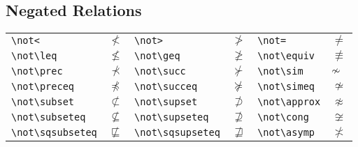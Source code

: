 \subsection{Negated Relations}
\begin{table}[!htbp]
    \centering
    \begin{tabular}{lp{2cm}lp{2cm}lp{2cm}}
	\verb|\not<|		& $\not<$ &
	\verb|\not>|		& $\not>$ & 
	\verb|\not=|		& $\not=$	\\ 
	\verb|\not\leq|		& $\not\leq$ &
	\verb|\not\geq|		& $\not\geq$ & 
	\verb|\not\equiv|	& $\not\equiv$	\\ 
	\verb|\not\prec|	& $\not\prec$    & 
	\verb|\not\succ|	& $\not\succ$    & 
	\verb|\not\sim|		& $\not\sim$	\\ 
	\verb|\not\preceq|	& $\not\preceq$    & 
	\verb|\not\succeq|	& $\not\succeq$    & 
	\verb|\not\simeq|	& $\not\simeq$	\\ 
	\verb|\not\subset|	& $\not\subset$    & 
	\verb|\not\supset|	& $\not\supset$    & 
	\verb|\not\approx|	& $\not\approx$	\\ 
	\verb|\not\subseteq|    & $\not\subseteq$	& 
	\verb|\not\supseteq|    & $\not\supseteq$    & 
	\verb|\not\cong|	& $\not\cong$	\\ 
	\verb|\not\sqsubseteq|  & $\not\sqsubseteq$ & 
	\verb|\not\sqsupseteq|  & $\not\sqsupseteq$	&   
	\verb|\not\asymp|	& $\not\asymp$	\\ 
    \end{tabular}
\end{table}

